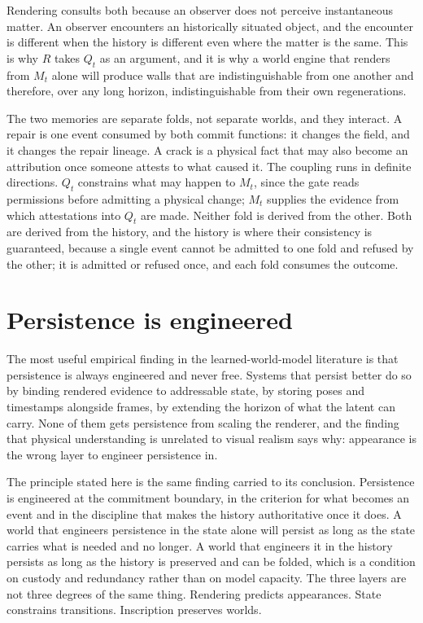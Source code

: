 \documentclass[11pt]{article}
\begin{document}
Rendering consults both because an observer does not perceive instantaneous matter. An observer encounters an historically situated object, and the encounter is different when the history is different even where the matter is the same. This is why $R$ takes $Q_t$ as an argument, and it is why a world engine that renders from $M_t$ alone will produce walls that are indistinguishable from one another and therefore, over any long horizon, indistinguishable from their own regenerations.

The two memories are separate folds, not separate worlds, and they interact. A repair is one event consumed by both commit functions: it changes the field, and it changes the repair lineage. A crack is a physical fact that may also become an attribution once someone attests to what caused it. The coupling runs in definite directions. $Q_t$ constrains what may happen to $M_t$, since the gate reads permissions before admitting a physical change; $M_t$ supplies the evidence from which attestations into $Q_t$ are made. Neither fold is derived from the other. Both are derived from the history, and the history is where their consistency is guaranteed, because a single event cannot be admitted to one fold and refused by the other; it is admitted or refused once, and each fold consumes the outcome.

\section{Persistence is engineered}

The most useful empirical finding in the learned-world-model literature is that persistence is always engineered and never free. Systems that persist better do so by binding rendered evidence to addressable state, by storing poses and timestamps alongside frames, by extending the horizon of what the latent can carry. None of them gets persistence from scaling the renderer, and the finding that physical understanding is unrelated to visual realism says why: appearance is the wrong layer to engineer persistence in.

The principle stated here is the same finding carried to its conclusion. Persistence is engineered at the commitment boundary, in the criterion for what becomes an event and in the discipline that makes the history authoritative once it does. A world that engineers persistence in the state alone will persist as long as the state carries what is needed and no longer. A world that engineers it in the history persists as long as the history is preserved and can be folded, which is a condition on custody and redundancy rather than on model capacity. The three layers are not three degrees of the same thing. Rendering predicts appearances. State constrains transitions. Inscription preserves worlds.
\end{document}

